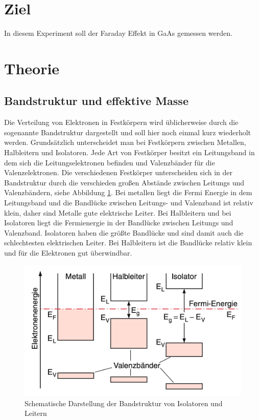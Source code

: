 \section{Ziel}
In diesem Experiment soll der Faraday Effekt in GaAs gemessen werden.
\section{Theorie}
\label{sec:Theorie}
\subsection{Bandstruktur und effektive Masse}
Die Verteilung von Elektronen in Festkörpern wird üblicherweise durch die sogenannte Bandstruktur dargestellt und soll hier noch einmal kurz wiederholt werden.
Grundsätzlich unterscheidet man bei Festkörpern zwischen Metallen, Halbleitern und Isolatoren.
Jede Art von Festkörper besitzt ein Leitungsband in dem sich die Leitungselektronen befinden und Valenzbänder für die Valenzelektronen.
Die verschiedenen Festkörper unterscheiden sich in der Bandstruktur durch die verschieden großen Abstände zwischen Leitungs und Valenzbändern, siehe Abbildung \ref{fig:bandstruk}.
Bei metallen liegt die Fermi Energie in dem Leitungsband und die Bandlücke zwischen Leitungs- und Valenzband ist relativ klein, daher sind Metalle gute elektrische Leiter.
Bei Halbleitern und bei Isolatoren liegt die Fermienergie in der Bandlücke zwischen Leitungs und Valenzband. 
Isolatoren haben die größte Bandlücke und sind damit auch die schlechtesten elektrischen Leiter. 
Bei Halbleitern ist die Bandlücke relativ klein und für die Elektronen gut überwindbar.
\begin{figure}[ht]
    \centering
    \includegraphics[scale = 0.5]{./bilder/Bandstruktur_demtroeder.png}
    \caption{Schematische Darstellung der Bandstruktur von Isolatoren und Leitern \cite{demtröder}}
    \label{fig:bandstruk}
\end{figure}

